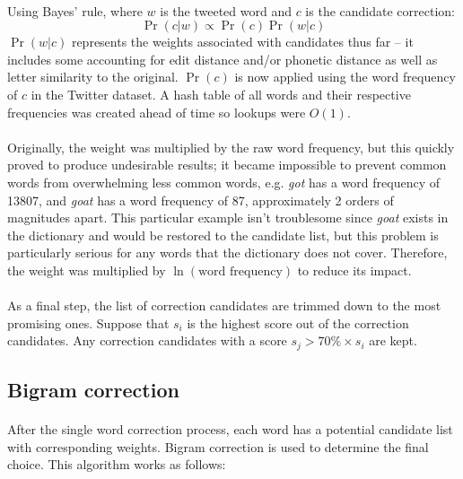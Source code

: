 \documentclass[twocolumn,10pt]{article}
\begin{document}
\paragraph{}Using Bayes' rule, where $w$ is the tweeted word and $c$ is the candidate correction:
$$\Pr(c|w) \varpropto \Pr(c) \Pr(w|c)$$
$\Pr(w|c)$ represents the weights associated with candidates thus far -- it includes some accounting for edit distance and/or phonetic distance as well as letter similarity to the original. $\Pr(c)$ is now applied using the word frequency of $c$ in the Twitter dataset. A hash table of all words and their respective frequencies was created ahead of time so lookups were $O(1)$. \paragraph{} Originally, the weight was multiplied by the raw word frequency, but this quickly proved to produce undesirable results; it became impossible to prevent common words from overwhelming less common words, e.g. \textit{got} has a word frequency of 13807, and \textit{goat} has a word frequency of 87, approximately 2 orders of magnitudes apart. This particular example isn't troublesome since \textit{goat} exists in the dictionary and would be restored to the candidate list, but this problem is particularly serious for any words that the dictionary does not cover. Therefore, the weight was multiplied by $\ln (\text{word frequency})$ to reduce its impact.
\paragraph{}As a final step, the list of correction candidates are trimmed down to the most promising ones. Suppose that $s_i$ is the highest score out of the correction candidates. Any correction candidates with a score $s_j > 70\% \times s_i$ are kept.
\subsection*{Bigram correction}
\paragraph{}After the single word correction process, each word has a potential candidate list with corresponding weights. Bigram correction is used to determine the final choice. This algorithm works as follows:
\end{document}
